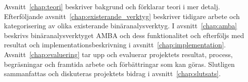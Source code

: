 Avsnitt~\ref{chap:teori} beskriver bakgrund och förklarar teori i mer detalj.
Efterföljande avsnitt~\ref{chap:existerande_verktyg} beskriver tidigare arbete
och kategorisering av olika existerande binäranalysverktyg. I
avsnitt~\ref{chap:amba} beskrivs binäranalysverktyget AMBA och dess
funktionalitet och efterföljs med resultat och implementationsbeskrivning i
avsnitt~\ref{chap:implementation}. Avsnitt~\ref{chap:evaluering} tar upp och
evaluerar projektets resultat, process, begräsningar och framtida arbete och
förbättringar som kan göras. Slutligen sammanfattas och diskuteras projektets
bidrag i avsnitt~\ref{chap:slutsats}.

